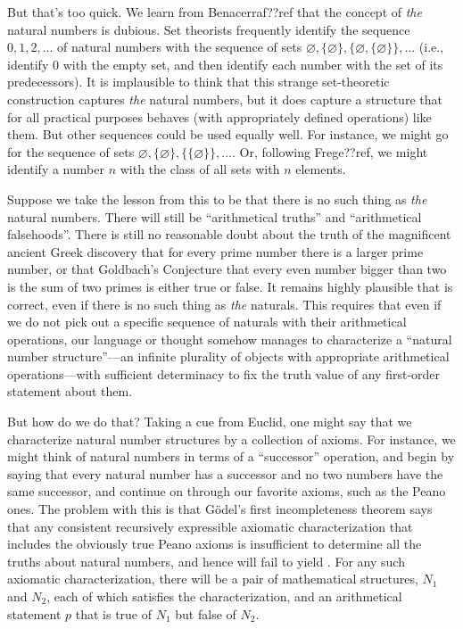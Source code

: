 But that's too quick. We learn from Benacerraf??ref that the concept of \textit{the} natural numbers is dubious. Set theorists
frequently identify the sequence $0,1,2,...$ of natural numbers with the sequence of sets $\varnothing, \{\varnothing\},
\{\varnothing, \{\varnothing\}\},...$ (i.e., identify $0$ with the empty set, and then identify each number with the 
set of its predecessors). It is implausible to think that this strange set-theoretic construction captures 
\textit{the} natural numbers, but it does capture a structure that for all practical purposes behaves (with appropriately
defined operations) like them. But other sequences could be used equally well. For instance, we might 
go for the sequence of sets $\varnothing, \{\varnothing\}, \{\{\varnothing\}\},...$. Or, following Frege??ref, we might 
identify a number $n$ with the class of all sets with $n$ elements. 

Suppose we take the lesson from this to be that there is no such thing as \textit{the} natural numbers. There will still be 
``arithmetical truths'' and ``arithmetical falsehoods''. There is still no reasonable doubt about the truth of the magnificent ancient
Greek discovery that for every prime number there is a larger prime number, or that Goldbach's Conjecture that every even
number bigger than two is the sum of two primes is either true or false. It remains highly plausible that 
is correct, even if there is no such thing as \textit{the} naturals. This requires that even if we do not pick out a 
specific sequence of naturals with their arithmetical operations, our language or thought somehow manages to characterize
a ``natural number structure''---an infinite plurality of objects with appropriate arithmetical operations---with sufficient
determinacy to fix the truth value of any first-order statement about them.

But how do we do that? Taking a cue from Euclid, one might say that we characterize natural number structures by a collection
of axioms. For instance, we might think of natural numbers in terms of a ``successor'' operation, and begin by saying that every natural number has a successor and no two numbers have the same successor, and continue on through our favorite axioms, such as 
the Peano ones. The problem with this is that G\"odel's first incompleteness theorem says that any consistent recursively expressible 
axiomatic characterization that includes the obviously true Peano axioms is insufficient to determine all the truths about natural numbers, and hence will fail to yield . For any such axiomatic characterization, there will be a pair of 
mathematical structures, $N_1$ and $N_2$, each of which satisfies the characterization, and an arithmetical statement $p$ that 
is true of $N_1$ but false of $N_2$. 

